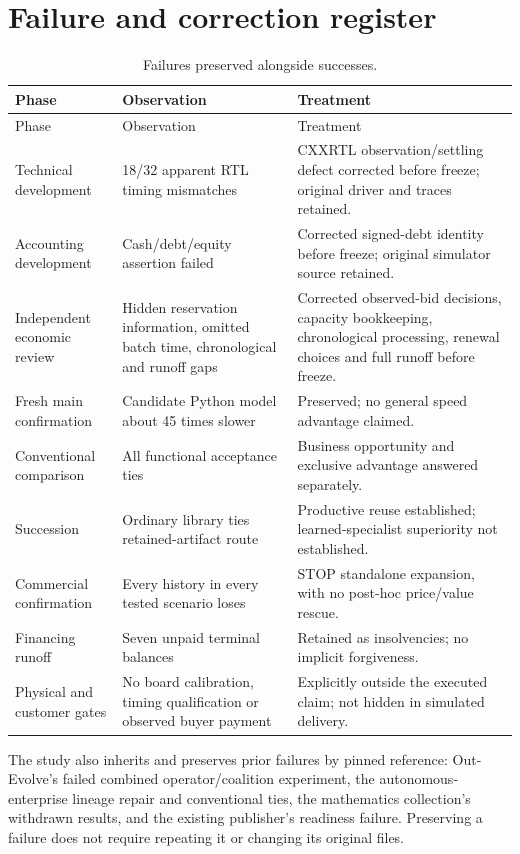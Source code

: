 \section{Failure and correction register}
\begin{longtable}{L{0.20\textwidth}L{0.34\textwidth}L{0.37\textwidth}}
\caption{Failures preserved alongside successes.}\label{tab:failures}\\
\toprule Phase & Observation & Treatment\\
\midrule\endfirsthead
\toprule Phase & Observation & Treatment\\\midrule\endhead
Technical development & 18/32 apparent RTL timing mismatches & CXXRTL observation/settling defect corrected before freeze; original driver and traces retained.\\
Accounting development & Cash/debt/equity assertion failed & Corrected signed-debt identity before freeze; original simulator source retained.\\
Independent economic review & Hidden reservation information, omitted batch time, chronological and runoff gaps & Corrected observed-bid decisions, capacity bookkeeping, chronological processing, renewal choices and full runoff before freeze.\\
Fresh main confirmation & Candidate Python model about 45 times slower & Preserved; no general speed advantage claimed.\\
Conventional comparison & All functional acceptance ties & Business opportunity and exclusive advantage answered separately.\\
Succession & Ordinary library ties retained-artifact route & Productive reuse established; learned-specialist superiority not established.\\
Commercial confirmation & Every history in every tested scenario loses & STOP standalone expansion, with no post-hoc price/value rescue.\\
Financing runoff & Seven unpaid terminal balances & Retained as insolvencies; no implicit forgiveness.\\
Physical and customer gates & No board calibration, timing qualification or observed buyer payment & Explicitly outside the executed claim; not hidden in simulated delivery.\\
\bottomrule
\end{longtable}

The study also inherits and preserves prior failures by pinned reference: Out-Evolve's failed combined operator/coalition experiment, the autonomous-enterprise lineage repair and conventional ties, the mathematics collection's withdrawn results, and the existing publisher's readiness failure. Preserving a failure does not require repeating it or changing its original files.

